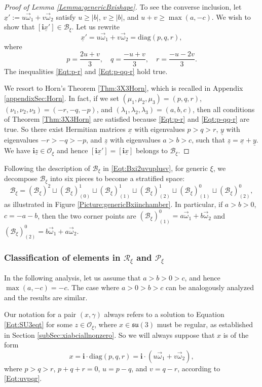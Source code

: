 \documentclass[12pt]{amsart}
\theoremstyle{definition}
\numberwithin{equation}{section}
\def\diag{\mathrm{diag}}
\newcommand{\abs}[1]{\lvert#1\rvert}
\newcommand{\imagunit}{\mathbf{i}}
\newcommand{\su}{\mathfrak{su}}
\newcommand{\Oxi}{\mathcal{O}_{\xi}}
\newcommand{\Reducedxi}{\mathcal{R}_\xi}
\newcommand{\Pxi}{\mathcal{P}_{\xi}}
\newcommand{\Bxi}{\mathcal{B}_{\xi}}
\begin{document}
\begin{proof}[Proof of Lemma \ref{Lemma:genericBxishape}]
To see the converse inclusion, let $\underline{x}':=u\vec{\omega}_1+ v\vec{\omega}_2$ satisfy  $u\geqslant {\abs{b}}$, $v\geqslant {\abs{b}}$, and $u+v\geqslant \max(a,-c)$. We wish to show that $[\imagunit  \underline{x}']\in \Bxi $. Let us rewrite $$\underline{x}' =u\vec{\omega}_1+ v\vec{\omega}_2=\diag(p,q,r),$$
where $$p=\frac{2u+v}{3},\quad q=\frac{-u+v}{3},\quad r=\frac{-u-2v}{3}.$$ 
The inequalities \eqref{Eqt:p-r} and \eqref{Eqt:p-qq-r} hold true.


We resort to Horn's Theorem \ref{Thm:3X3Horn}, which is recalled in Appendix \ref{appendixSec:Horn}. In fact, if we set $(\mu_1,\mu_2,\mu_3)=(p,q,r)$, $(\nu_1,\nu_2,\nu_3)=(-r,-q,-p)$, and $(\lambda_1,\lambda_2,\lambda_3)=(a,b,c) $, then all conditions of Theorem \ref{Thm:3X3Horn} are satisfied because \eqref{Eqt:p-r} and \eqref{Eqt:p-qq-r} are true. So there exist Hermitian matrices $\underline{x}$ with eigenvalues $p> q> r $, $\underline{y}$ with eigenvalues $ -r>  -q>  -p $, and $\underline{z}$ with eigenvalues $ a> b> c $, such that $\underline{z}=\underline{x}+\underline{y}$. We have $\imagunit\underline{z}\in \Oxi$ and hence $[\imagunit \underline{x}']=[\imagunit \underline{x}] $ belongs to $\Bxi $. 
\end{proof}


Following the description of $\Bxi $ in \eqref{Eqt:Bxi2uvuplusv}, for generic $\xi$, we decompose  $\Bxi $ into six pieces to become a stratified space:
$$
\Bxi =(\Bxi)^2    \sqcup (\Bxi)^1_{(0)}  \sqcup (\Bxi)^1_{(1)}  \sqcup (\Bxi)^1_{(2)}  \sqcup
(\Bxi)^0_{(1)}  \sqcup(\Bxi)^0_{(2)}  ,
$$
as illustrated in Figure \ref{Picture:genericBxiinchamber}. In particular, if $a>b>0$, $c=-a-b$, then the two corner points are $(\Bxi)^0_{(1)}  =a\vec{\omega}_1+b \vec{\omega}_2$ and $(\Bxi)^0_{(2)}  =b\vec{\omega}_1+a \vec{\omega}_2$. 

 
 
 \subsubsection{Classification of elements in $\Reducedxi   $ and $\Pxi $}
\label{Sec:genericRxirefined}

In the following analysis, let us assume that $a>b>0>c$, and hence $\max(a,-c)=-c$. The case where $a>0>b>c$ can be analogously analyzed and the results are similar.


Our notation for a pair $(x,\gamma)$  always refers to a solution to Equation \eqref{Eqt:SU3eqt} for some $z\in \Oxi$, where  $x\in\su(3)$ must be regular, as established in Section \ref{subSec:xiabciallnonzero}. So we will always suppose that $x$ is of the form $$x =\imagunit \cdot \diag(p, q, r)=\imagunit\cdot (u\vec{\omega}_1+ v\vec{\omega}_2) ,$$ where $p>q>r$, $p + q + r = 0$,  $u= {p-q}$, and $v= {q-r}$, according to \eqref{Eqt:uvpqr}.
\end{document}

